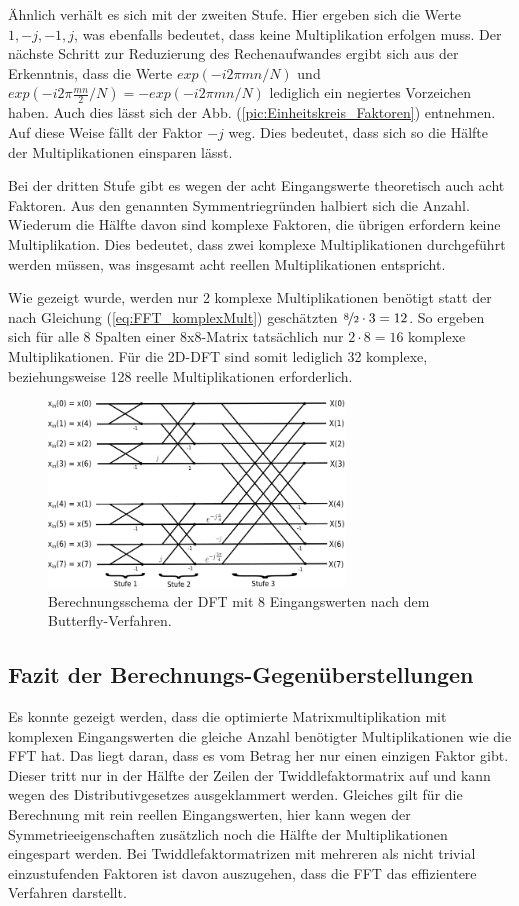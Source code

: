 Ähnlich verhält es sich mit der zweiten Stufe.
Hier ergeben sich die Werte $1, -j, -1, j$, was ebenfalls bedeutet, dass keine Multiplikation erfolgen muss. Der nächste Schritt zur Reduzierung des Rechenaufwandes ergibt sich
aus der Erkenntnis, dass die Werte $exp(-i 2 \pi m n/N)$ und $exp(-i 2 \pi \frac{m n}{2}/N) = -exp(-i 2 \pi m n/N)$ lediglich ein negiertes Vorzeichen haben. Auch dies lässt sich der 
Abb. (\ref{pic:Einheitskreis_Faktoren}) entnehmen. Auf diese Weise fällt der Faktor $-j$ weg. Dies bedeutet, dass sich so die Hälfte der Multiplikationen einsparen lässt.

Bei der dritten Stufe gibt es wegen der acht Eingangswerte theoretisch auch acht Faktoren. Aus den genannten Symmentriegründen halbiert sich die Anzahl. Wiederum die Hälfte davon 
sind komplexe Faktoren, die übrigen erfordern keine Multiplikation. Dies bedeutet, dass zwei komplexe Multiplikationen durchgeführt werden müssen, was insgesamt acht reellen 
Multiplikationen entspricht. 

Wie gezeigt wurde, werden nur 2 komplexe Multiplikationen benötigt statt der nach Gleichung (\ref{eq:FFT_komplexMult}) geschätzten $\nicefrac{8}{2}\cdot 3 = 12$.
So ergeben sich für alle 8 Spalten einer 8x8-Matrix tatsächlich nur $2\cdot8=16$ komplexe Multiplikationen. 
Für die 2D-DFT sind somit lediglich 32 komplexe, beziehungsweise 128 reelle Multiplikationen erforderlich.



\begin{figure}[htbp]
 \centering
 \includegraphics[width=0.7\textwidth]{img/Butterfly.png}
 \caption{Berechnungsschema der DFT mit 8 Eingangswerten nach dem Butterfly-Verfahren.}
 \label{pic:Butterfly}
\end{figure}


\subsection{Fazit der Berechnungs-Gegenüberstellungen}
Es konnte gezeigt werden, dass die optimierte Matrixmultiplikation mit komplexen Eingangswerten die gleiche Anzahl benötigter Multiplikationen wie die FFT hat.
Das liegt daran, dass es vom Betrag her nur einen einzigen Faktor gibt. Dieser tritt nur in der Hälfte der Zeilen der Twiddlefaktormatrix auf und kann wegen des Distributivgesetzes
ausgeklammert werden. Gleiches gilt für die Berechnung mit rein reellen Eingangswerten, hier kann wegen der Symmetrieeigenschaften zusätzlich noch die Hälfte der
Multiplikationen eingespart werden.
Bei Twiddlefaktormatrizen mit mehreren als nicht trivial einzustufenden Faktoren ist davon auszugehen, dass die FFT das effizientere Verfahren darstellt. 

